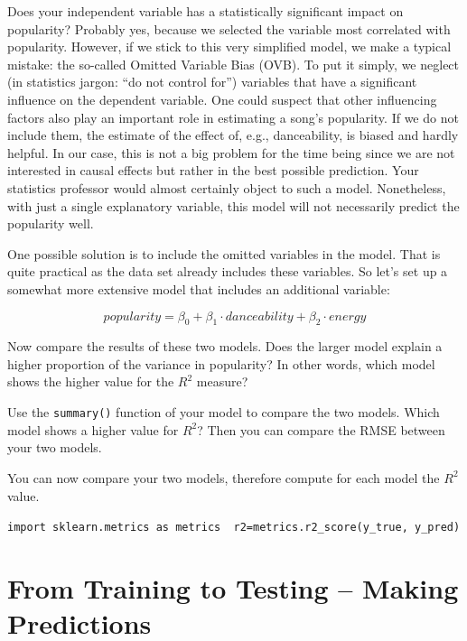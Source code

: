 \documentclass[
  11pt,
]{book}
\newenvironment{tips}[1]
  {
  \begin{itemize}
  \footnotesize
  \renewcommand{\labelitemi}{
    \raisebox{-.7\height}[0pt][0pt]{
      {\setkeys{Gin}{width=3em,keepaspectratio}
        \texttt{[image: images/\#1.png]}}
    }
  }
  \setlength{\fboxsep}{1em}
  \begin{rbox}
  \item
  }
  {
  \end{rbox}
  \end{itemize}
  }
\newenvironment{tipsp}[1]
  {
  \begin{itemize}
  \footnotesize
  \renewcommand{\labelitemi}{
    \raisebox{-.7\height}[0pt][0pt]{
      {\setkeys{Gin}{width=3em,keepaspectratio}
        \texttt{[image: images/\#1.png]}}
    }
  }
  \setlength{\fboxsep}{1em}
  \begin{pbox}
  \item
  }
  {
  \end{pbox}
  \end{itemize}
  }
\begin{document}
Does your independent variable has a statistically significant impact on popularity? Probably yes, because we selected the variable most correlated with popularity. However, if we stick to this very simplified model, we make a typical mistake: the so-called Omitted Variable Bias (OVB). To put it simply, we neglect (in statistics jargon: ``do not control for'') variables that have a significant influence on the dependent variable. One could suspect that other influencing factors also play an important role in estimating a song's popularity. If we do not include them, the estimate of the effect of, e.g., danceability, is biased and hardly helpful. In our case, this is not a big problem for the time being since we are not interested in causal effects but rather in the best possible prediction. Your statistics professor would almost certainly object to such a model. Nonetheless, with just a single explanatory variable, this model will not necessarily predict the popularity well.

One possible solution is to include the omitted variables in the model. That is quite practical as the data set already includes these variables. So let's set up a somewhat more extensive model that includes an additional variable:

\[ popularity = \beta_0 + \beta_1 \cdot danceability + \beta_2 \cdot energy \]

Now compare the results of these two models. Does the larger model explain a higher proportion of the variance in popularity? In other words, which model shows the higher value for the \(R^2\) measure?

\begin{tips}r

Use the \texttt{summary()} function of your model to compare the two models. Which model shows a higher value for \(R^2\)? Then you can compare the RMSE between your two models.

\end{tips}

\begin{tipsp}p

You can now compare your two models, therefore compute for each model the \(R^2\) value.

\texttt{import\ sklearn.metrics\ as\ metrics\ \ r2=metrics.r2\_score(y\_true,\ y\_pred)}

\end{tipsp}

\hypertarget{from-training-to-testing-making-predictions}{%
\section{From Training to Testing -- Making Predictions}\label{from-training-to-testing-making-predictions}}
\end{document}
